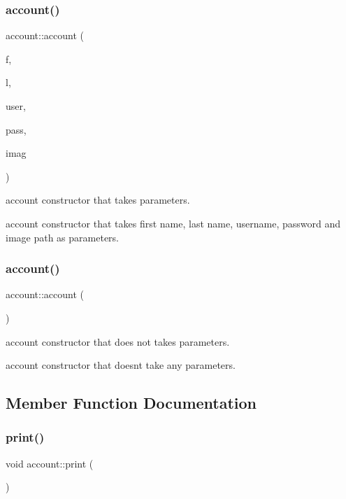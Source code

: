 \subsubsection{\texorpdfstring{account()}{account()}\hspace{0.1cm}{\footnotesize\ttfamily [1/2]}}
{\footnotesize\ttfamily account\+::account (\begin{DoxyParamCaption}\item[{Q\+String}]{f,  }\item[{Q\+String}]{l,  }\item[{Q\+String}]{user,  }\item[{Q\+String}]{pass,  }\item[{Q\+String}]{imag }\end{DoxyParamCaption})}



account constructor that takes parameters. 

account constructor that takes first name, last name, username, password and image path as parameters. \mbox{\label{classaccount_a96261021a96c9792b16081e8fcaf23a3}} 
\subsubsection{\texorpdfstring{account()}{account()}\hspace{0.1cm}{\footnotesize\ttfamily [2/2]}}
{\footnotesize\ttfamily account\+::account (\begin{DoxyParamCaption}{ }\end{DoxyParamCaption})}



account constructor that does not takes parameters. 

account constructor that doesn\textquotesingle{}t take any parameters. 

\subsection{Member Function Documentation}
\mbox{\label{classaccount_a94a72bcc59f4875ba0ad26f660150ed1}} 
\subsubsection{\texorpdfstring{print()}{print()}}
{\footnotesize\ttfamily void account\+::print (\begin{DoxyParamCaption}{ }\end{DoxyParamCaption})}



